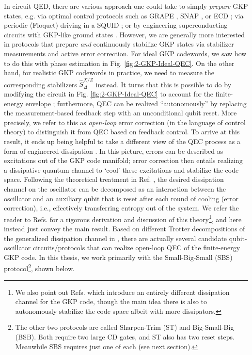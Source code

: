 In circuit QED, there are various approach one could take to simply \textit{prepare} GKP states, e.g. via optimal control protocols such as GRAPE \cite{khaneja2005grape, reinhold2019thesis}, SNAP \cite{krastanov2015-SNAP, heeres2015-SNAP, fosel2020-SNAP}, or ECD \cite{eickbusch2022fast}; via periodic (Floquet) driving in a SQUID \cite{gkp-periodic-drive2024}; or by engineering superconducting circuits with GKP-like ground states \cite{rymarz2021hardwaregkp}. However, we are generally more interested in protocols that prepare \textit{and} continuously stabilize GKP states via stabilizer measurements and active error correction. For ideal GKP codewords, we saw how to do this with phase estimation in Fig. \ref{fig:2-GKP-Ideal-QEC}. On the other hand, for realistic GKP codewords in practice, we need to measure the corresponding stabilizers $\hat{S}_\Delta^{X/Z}$ instead. It turns that this is possible to do by modifying the circuit in Fig. \ref{fig:2-GKP-Ideal-QEC} to account for the finite-energy envelope \cite{fluhmann2019gkp-expt, campagne2020gkp-expt, royer2020gkp, deneeve2022gkp-expt}; furthermore, QEC can be realized ``autonomously'' by replacing the measurement-based feedback step with an unconditional qubit reset. More precisely, we refer to this as \textit{open-loop} error correction (in the language of control theory) to distinguish it from QEC based on feedback control. To arrive at this result, it ends up being helpful to take a different view of the QEC process as a form of engineered dissipation \cite{royer2020gkp, vlad2023thesis}. In this picture, errors can be described as excitations out of the GKP code manifold; error correction then entails realizing a dissipative quantum channel to `cool' these excitations and stabilize the code space. Following the theoretical treatment in Ref. \cite{royer2020gkp}, the desired dissipation channel on the oscillator can be decomposed as an interaction between the oscillator and an auxiliary qubit that is reset after each round of cooling (error correction), i.e., effectively transferring entropy out of the system. We refer the reader to Refs. \cite{royer2020gkp, sivak2023gkp-expt, vlad2023thesis} for a rigorous derivation and discussion of this theory\footnote{We also point out Refs. \cite{sellem2023gkp, sellem2024gkp} which introduce an entirely different dissipation channel for the GKP code, though the main idea there is also to autonomously stabilize the code space albeit with more dissipators.}, and here instead just convey the main result. Based on different Trotter decompositions of the generalized dissipation channel in \cite{royer2020gkp}, there are actually several candidate qubit-oscillator circuits/protocols that can realize open-loop QEC of the finite-energy GKP code. In this thesis, we work primarily with the Small-Big-Small (SBS) protocol\footnote{The other two protocols are called Sharpen-Trim (ST) and Big-Small-Big (BSB). Both require two large CD gates, and ST also has two reset steps. Meanwhile SBS requires just one of each (see next section).}, shown below. 

